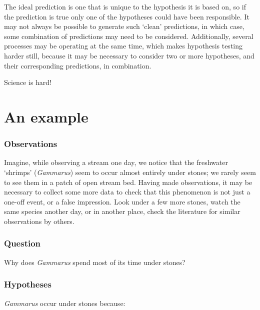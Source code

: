 \documentclass[
]{book}
\begin{document}
The ideal prediction is one that is unique to the hypothesis it is based on, so if the prediction is true only one of the hypotheses could have been responsible. It may not always be possible to generate such `clean' predictions, in which case, some combination of predictions may need to be considered. Additionally, several processes may be operating at the same time, which makes hypothesis testing harder still, because it may be necessary to consider two or more hypotheses, and their corresponding predictions, in combination.

Science is hard!

\hypertarget{an-example}{%
\section{An example}\label{an-example}}

\hypertarget{observations}{%
\subsubsection*{Observations}\label{observations}}

Imagine, while observing a stream one day, we notice that the freshwater `shrimps' (\emph{Gammarus}) seem to occur almost entirely under stones; we rarely seem to see them in a patch of open stream bed. Having made observations, it may be necessary to collect some more data to check that this phenomenon is not just a one-off event, or a false impression. Look under a few more stones, watch the same species another day, or in another place, check the literature for similar observations by others.

\hypertarget{question}{%
\subsubsection*{Question}\label{question}}

Why does \emph{Gammarus} spend most of its time under stones?

\hypertarget{hypotheses}{%
\subsubsection*{Hypotheses}\label{hypotheses}}

\emph{Gammarus} occur under stones because:
\end{document}
